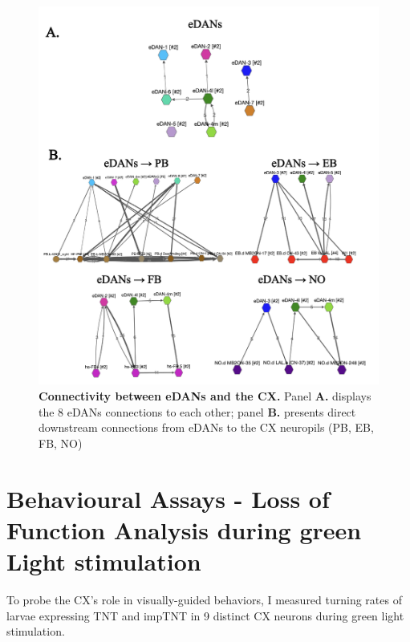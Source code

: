         \begin{figure}[H]
            \centering
            \includegraphics[width=12cm]{Figs/CX/eDANstoCX.pdf}
            \caption[eDANs Connections to the CX]{\textbf{Connectivity between eDANs and the CX.} Panel \textbf{A.} displays the 8 eDANs connections to each other; panel \textbf{B.} presents direct downstream connections from eDANs to the CX neuropils (PB, EB, FB, NO)}
            \label{eDANstoCX}
        \end{figure}


\section{Behavioural Assays - Loss of Function Analysis during green Light stimulation}

         To probe the CX's role in visually-guided behaviors, I measured turning rates of larvae expressing TNT and impTNT in 9 distinct CX neurons during green light stimulation.  
         

